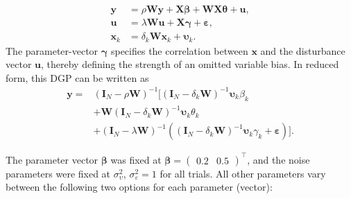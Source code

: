 \documentclass[
  letterpaper,
  DIV=11,
  numbers=noendperiod]{scrreprt}
\begin{document}
\[
\begin{split}
{\boldsymbol{\mathbf{y}}}&=\rho{\boldsymbol{\mathbf{W}}}{\boldsymbol{\mathbf{y}}}+{\boldsymbol{\mathbf{X}}}{\boldsymbol{\mathbf{\beta}}}+{\boldsymbol{\mathbf{W}}}{\boldsymbol{\mathbf{X}}}{\boldsymbol{\mathbf{\theta}}}+ {\boldsymbol{\mathbf{u}}},\\ 
{\boldsymbol{\mathbf{u}}}&=\lambda{\boldsymbol{\mathbf{W}}}{\boldsymbol{\mathbf{u}}}+{\boldsymbol{\mathbf{X}}}{\boldsymbol{\mathbf{\gamma}}}+{\boldsymbol{\mathbf{\varepsilon}}},\\
{\boldsymbol{\mathbf{x}}}_k&=\delta_k{\boldsymbol{\mathbf{W}}}{\boldsymbol{\mathbf{x}}}_k+{\boldsymbol{\mathbf{\upsilon}}}_k.
\end{split}
\] The parameter-vector \({\boldsymbol{\mathbf{\gamma}}}\) specifies the
correlation between \({\boldsymbol{\mathbf{x}}}\) and the disturbance
vector \({\boldsymbol{\mathbf{u}}}\), thereby defining the strength of
an omitted variable bias. In reduced form, this DGP can be written as \[
\begin{split}
{\boldsymbol{\mathbf{y}}}=&({\boldsymbol{\mathbf{I}}_N}-\rho {\boldsymbol{\mathbf{W}}})^{-1}\big[({\boldsymbol{\mathbf{I}}_N}-\delta_k {\boldsymbol{\mathbf{W}}})^{-1}{\boldsymbol{\mathbf{\upsilon}}_k}\beta_k \\
&+{\boldsymbol{\mathbf{W}}}({\boldsymbol{\mathbf{I}}_N}-\delta_k {\boldsymbol{\mathbf{W}}})^{-1}{\boldsymbol{\mathbf{\upsilon}}_k}\theta_k \\
&+({\boldsymbol{\mathbf{I}}_N}-\lambda {\boldsymbol{\mathbf{W}}})^{-1}(({\boldsymbol{\mathbf{I}}_N}-\delta_k {\boldsymbol{\mathbf{W}}})^{-1}{\boldsymbol{\mathbf{\upsilon}}_k}\gamma_k+{\boldsymbol{\mathbf{\varepsilon}}})\big].
\end{split}
\]

The parameter vector \({\boldsymbol{\mathbf{\beta}}}\) was fixed at
\({\boldsymbol{\mathbf{\beta}}}=%
\begin{pmatrix}0.2&0.5\end{pmatrix}
^\intercal\), and the noise parameters were fixed at
\(\sigma^{2}_\upsilon\), \(\sigma^{2}_\varepsilon=1\) for all trials.
All other parameters vary between the following two options for each
parameter (vector):
\end{document}
